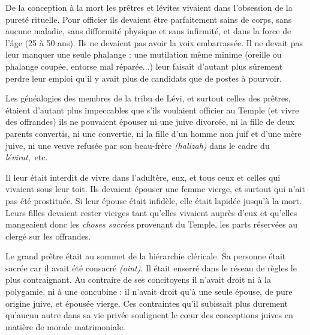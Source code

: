  De la conception à la mort les prêtres et lévites vivaient dans l'obsession de la pureté rituelle. Pour officier ils devaient être parfaitement sains de corps, sans aucune maladie, sans difformité physique et sans infirmité, et dans la force de l'âge (25 à 50 ans). Ils ne devaient pas avoir la voix embarrassée. Il ne devait pas leur manquer une seule phalange : une mutilation même minime (oreille ou phalange coupée, entorse mal réparée...) leur faisait d'autant plus sûrement perdre leur emploi qu'il y avait plus de candidats que de postes à pourvoir. 

 Les généalogies des membres de la tribu de Lévi, et surtout celles des prêtres, étaient d'autant plus impeccables que s'ils voulaient officier au Temple (et vivre des offrandes) ils ne pouvaient épouser ni une juive divorcée, ni la fille de deux parents convertis, ni une convertie, ni la fille d'un homme non juif et d'une mère juive, ni une veuve refusée par son beau-frère \emph{(halizah)} dans le cadre du \emph{lévirat},~etc. 

 Il leur était interdit de vivre dans l'adultère, eux, et tous ceux et celles qui vivaient sous leur toit. Ils devaient épouser une femme vierge, et surtout qui n'ait pas été prostituée. Si leur épouse était infidèle, elle était lapidée jusqu'à la mort. Leurs filles devaient rester vierges tant qu'elles vivaient auprès d'eux et qu'elles mangeaient donc les \emph{choses sacrées} provenant du Temple, les parts réservées au clergé sur les offrandes. 

 Le grand prêtre était au sommet de la hiérarchie cléricale. Sa personne était sacrée car il avait été consacré \emph{(oint)}. Il était enserré dans le réseau de règles le plus contraignant. Au contraire de ses concitoyens il n'avait droit ni à la polygamie, ni à une concubine : il n'avait droit qu'à une seule épouse, de pure origine juive, et épousée vierge. Ces contraintes qu'il subissait plus durement qu'aucun autre dans sa vie privée soulignent le cœur des conceptions juives en matière de morale matrimoniale.
 
 